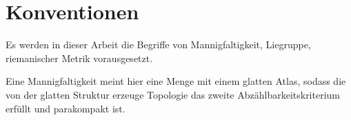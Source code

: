 


\section{Konventionen}
Es werden in dieser Arbeit die Begriffe von Mannigfaltigkeit, Liegruppe,
riemanischer Metrik vorausgesetzt.

Eine Mannigfaltigkeit meint hier eine Menge mit einem glatten Atlas, sodass die von der glatten Struktur erzeuge Topologie das zweite Abzählbarkeitskriterium erfüllt und parakompakt ist.

%
%
%
%
%
%
%


